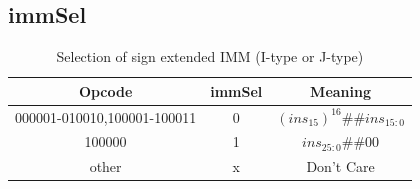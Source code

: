 \documentclass{article}
\begin{document}
\subsection{immSel}
\begin{table}[H]
    \centering
    \begin{tabular}{|c|c|c|}
        \hline
        \textbf{Opcode} & \textbf{immSel} & \textbf{Meaning} \\
        \hline
        000001-010010,100001-100011 & 0 & $(ins_{15})^{16}\#\#ins_{15:0}$ \\
        100000 & 1 & $ins_{25:0}\#\#00$ \\
        other & x & Don't Care \\
        \hline
    \end{tabular}
    \caption{Selection of sign extended IMM (I-type or J-type)}
\end{table}
\end{document}
